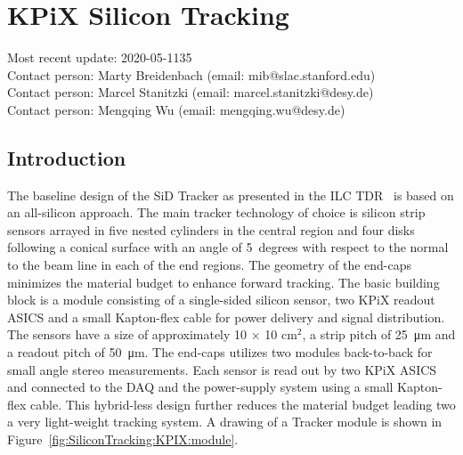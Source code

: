 \newcommand{\LYCORIS}{{\textsc{Lycoris}}\xspace}
\newcommand{\DESYII}{{\mbox{DESY II}}\xspace}
\newcommand{\DIITBF}{{\DESYII Test Beam Facility}\xspace}
\newcommand{\SID}{{SiD}\xspace}
\newcommand{\KPIX}{{KPiX}\xspace}


\section{\KPIX Silicon Tracking}
Most recent update: 2020-05-1135 \\
Contact person: Marty Breidenbach (email: mib@slac.stanford.edu)\\
Contact person: Marcel Stanitzki (email: marcel.stanitzki@desy.de)\\
Contact person: Mengqing Wu (email: mengqing.wu@desy.de)\\




\subsection{Introduction}
The baseline design of the \SID Tracker as presented in the ILC TDR~\cite{Behnke:2013lya} is based on an all-silicon approach.
The main tracker technology of choice is silicon strip sensors arrayed in five nested cylinders in the central
region and four disks following a conical surface with an angle of 5~degrees with respect to the normal to the 
beam line in each of the end regions. The geometry of the end-caps minimizes the material budget to enhance 
forward tracking. The basic building block is a module consisting of a single-sided silicon sensor, two \KPIX readout ASICS and a small Kapton-flex cable
for power delivery and signal distribution.
The sensors have a size of approximately 10 $\times$ 10 cm$^2$, a strip pitch of \SI{25}{\micro\meter} and a readout pitch of \SI{50}{\micro\meter}.
The end-caps utilizes two modules back-to-back for small angle stereo measurements. 
Each sensor is read out by two \KPIX ASICS and connected to the DAQ and the power-supply system using a small Kapton-flex cable. This hybrid-less design 
further reduces the material budget leading two a very light-weight tracking system. A drawing of a Tracker module is shown in 
Figure~\ref{fig:SiliconTracking:KPIX:module}.


